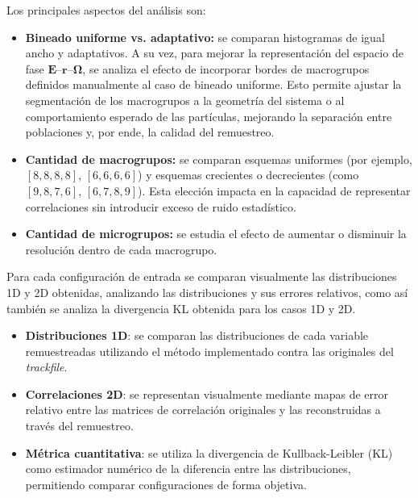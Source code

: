Los principales aspectos del análisis son:

\begin{itemize}
    
    \item \textbf{Bineado uniforme vs. adaptativo:} se comparan histogramas de igual ancho y adaptativos. A su vez, para mejorar la representación del espacio de fase $\textbf{E}$–$\textbf{r}$–$\boldsymbol{\Omega}$, se analiza el efecto de incorporar bordes de macrogrupos definidos manualmente al caso de bineado uniforme. Esto permite ajustar la segmentación de los macrogrupos a la geometría del sistema o al comportamiento esperado de las partículas, mejorando la separación entre poblaciones y, por ende, la calidad del remuestreo.

    \item \textbf{Cantidad de macrogrupos:} se comparan esquemas uniformes (por ejemplo, $[8,8,8,8]$, $[6,6,6,6]$) y esquemas crecientes o decrecientes (como $[9,8,7,6]$, $[6,7,8,9]$). Esta elección impacta en la capacidad de representar correlaciones sin introducir exceso de ruido estadístico.
    
    \item \textbf{Cantidad de microgrupos:} se estudia el efecto de aumentar o disminuir la resolución dentro de cada macrogrupo.
    
\end{itemize}

Para cada configuración de entrada se comparan visualmente las distribuciones 1D y 2D obtenidas, analizando las distribuciones y sus errores relativos, como así también se analiza la divergencia KL obtenida para los casos 1D y 2D.

\begin{itemize}
    \item \textbf{Distribuciones 1D}: se comparan las distribuciones de cada variable remuestreadas utilizando el método implementado contra las originales del \emph{trackfile}. 
    \item \textbf{Correlaciones 2D}: se representan visualmente mediante mapas de error relativo entre las matrices de correlación originales y las reconstruidas a través del remuestreo.
    \item \textbf{Métrica cuantitativa}: se utiliza la divergencia de Kullback-Leibler (KL) como estimador numérico de la diferencia entre las distribuciones, permitiendo comparar configuraciones de forma objetiva.
\end{itemize}


